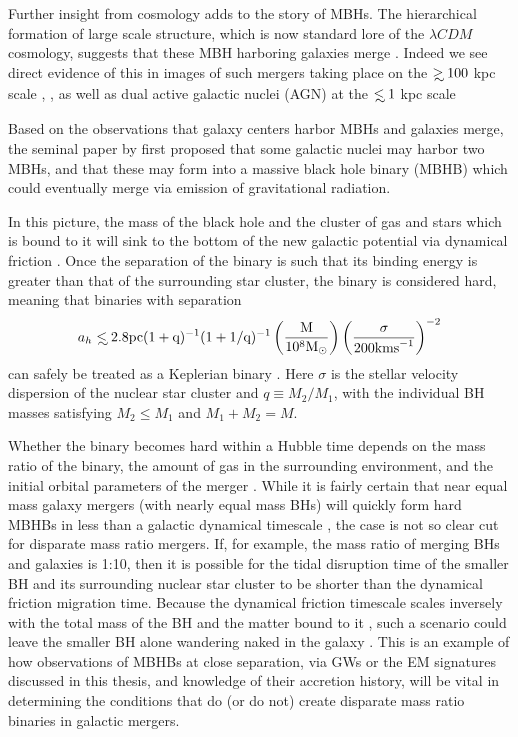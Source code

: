 Further insight from cosmology adds to the story of MBHs. The hierarchical
formation of large scale structure, which is now standard lore of the $\lambda
CDM$ cosmology, suggests that these MBH harboring galaxies merge \citep{HK2002}.
Indeed we see direct evidence of this in images of such mergers taking place
on the $\gsim 100$ kpc scale \citep{Comerford:2013}, \citep[see also][and
references therein]{Dotti:2012:rev}, as well as dual active galactic nuclei
(AGN) at the $\lsim 1$ kpc scale \citep{Komossa:2003, Fabbiano:2011,Rodriguez:2006, BurkeSpolaor:2011, ColpiDotti:2011:rev, Gitti:2013, Woo:subKpcBin:2014,
AndradeSantos:2016}


Based on the observations that galaxy centers harbor MBHs and galaxies merge,
the seminal paper by \cite{Begel:Blan:Rees:1980} first proposed that some
galactic nuclei may harbor two MBHs, and that these may form into a massive
black hole binary (MBHB) which could eventually merge via emission of
gravitational radiation.

In this picture, the mass of the black hole and the cluster of gas and stars
which is bound to it will sink to the bottom of the new galactic potential via
dynamical friction \citep{Begel:Blan:Rees:1980, Chandrasekhar:1943}. Once the
separation of the binary is such that its binding energy is
greater than that of the surrounding star cluster, the binary is considered
hard, meaning that binaries with separation
\begin{equation}
a_h \lsim 2.8 \rm{pc} (1+q)^{-1} (1+1/q)^{-1}  \left( \frac{M}{10^8 \Msun} \right)  
\left( \frac{\sigma}{200 \rm{km s}^{-1}} \right)^{-2}
\end{equation}
can safely be treated as a Keplerian binary
\citep[\textit{e.g.}][]{MerrittMilos:2005:LRR}. Here $\sigma$ is the stellar
velocity dispersion of the nuclear star cluster and $q\equiv M_2/M_1$, with
the individual BH masses satisfying $M_2 \leq M_1$ and $M_1+M_2=M$.

Whether the binary becomes hard within a Hubble time depends on the mass ratio
of the binary, the amount of gas in the surrounding environment, and the
initial orbital parameters of the merger \citep{Mayer:2013:MBHBGasRev}. While
it is fairly certain that near equal mass galaxy mergers (with nearly equal
mass BHs) will quickly form hard MBHBs in less than a galactic dynamical
timescale \citep{Mayer+2007, Chapon+2013}, the case is not so clear cut for
disparate mass ratio mergers. If, for example, the mass ratio of merging BHs
and galaxies is 1:10, then it is possible for the tidal disruption time of the
smaller BH and its surrounding nuclear star cluster to be shorter than the
dynamical friction migration time. Because the dynamical friction timescale
scales inversely with the total mass of the BH and the matter bound to it
\citep{Chandrasekhar:1943, ColpiDotti:2011:rev}, such a scenario could leave
the smaller BH alone wandering naked in the galaxy \citep{Callegari:2011,
Mayer:2013:MBHBGasRev}. This is an example of how observations of MBHBs at
close separation, via GWs or the EM signatures discussed in this thesis, and
knowledge of their accretion history, will be vital in determining the
conditions that do (or do not) create disparate mass ratio binaries in
galactic mergers.

